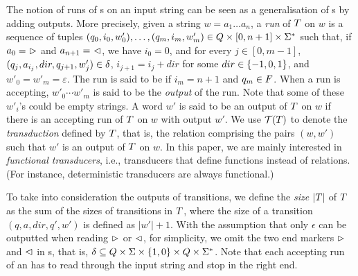 %
%
The notion of runs of \FFT{}s on an input string can be seen as a generalisation 
of \FFA{}s by adding outputs. More precisely, given a string $w = a_1 \dots a_n$, a \emph{run} of $T$ on $w$
is a sequence of tuples $(q_0, i_0, w'_0),\ldots, (q_m, i_m, w'_m) \in Q \times
[0, n+1] \times \Sigma^*$ 
such that, if $a_0 =\ \vartriangleright$ and $a_{n+1} =\ \vartriangleleft$, 
we have $i_0 = 0$, and  for every $j \in [0, m-1]$, $(q_j, a_{i_j}, dir, q_{j+1}, w'_j) \in
        \delta$, $i_{j+1} = i_j + dir$ for some $dir \in \{-1, 0, 1\}$, and $w'_0 = w'_m = \varepsilon$.
The run is said to be  if $i_m = n+1$ and $q_m \in F$.
When a run is accepting, $w'_0 \cdots w'_m$ is said to be the \emph{output} of the
run. Note that some of these $w'_i$'s could be empty strings.
A word $w'$ is said to be an output of $T$ on $w$ if there is an accepting run of
$T$ on $w$ with output $w'$. We use $\mathcal{T}(T)$ to denote the
\emph{transduction} defined by $T$, that is, the relation comprising
the pairs $(w,w')$ such that $w'$ is an output of $T$ on $w$. 
In this paper, we are mainly interested in \emph{functional
transducers}, i.e., transducers that define functions instead of relations. (For instance, deterministic transducers are always functional.) 

To take into consideration the outputs of transitions, we define the \emph{size} $|T|$ of $T$ as the sum of the sizes of transitions in $T$, where the size of a transition $(q, a, dir, q', w')$ is defined as $|w'|+1$. With the assumption that only $\epsilon$ can be outputted when reading $\vartriangleright$ or $\vartriangleleft$, for simplicity, we omit the two end markers $\vartriangleright$ and $\vartriangleleft$ in \FT{}s, that is, $\delta \subseteq Q \times \Sigma \times \{1,0\} \times Q \times \Sigma^*$. Note that each accepting run of an \FT{} has to read through the input string and stop in the right end.


